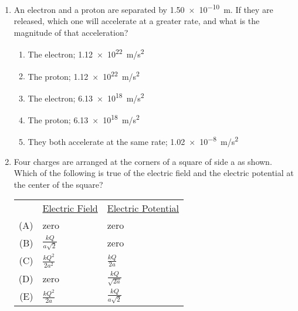 \documentclass{../../../oss-apphys}
\begin{document}
\begin{multicols}{2}
\begin{enumerate}[leftmargin=18pt]
  \item An electron and a proton are separated by \SI{1.50e-10}{\metre}. If
    they are released, which one will accelerate at a greater rate, and what is
    the magnitude of that acceleration?
    \begin{enumerate}[nosep,leftmargin=18pt,label=(\Alph*)]
    \item The electron; \SI{1.12e22}{m/s^2}
    \item The proton; \SI{1.12e22}{m/s^2}
    \item The electron; \SI{6.13e18}{m/s^2}
    \item The proton; \SI{6.13e18}{m/s^2}
    \item They both accelerate at the same rate; \SI{1.02e-8}{m/s^2}
    \end{enumerate}

  \item Four charges are arranged at the corners of a square of side a as shown.
    Which of the following is true of the electric field and the electric
    potential at the center of the square?
    \begin{center}
    \end{center}
    \begin{tabular}{rll}
      & \underline{Electric Field} & \underline{Electric Potential}\\
      (A) & zero & zero \\
      (B) & $\frac{kQ}{a\sqrt{2}}$ & zero \\
      (C) & $\frac{kQ^2}{2a^2}$ &  $\frac{kQ}{2a}$\\
      (D) & zero &  $\frac{kQ}{\sqrt{2a}}$\\
      (E) & $\frac{kQ^2}{2a}$ & $\frac{kQ}{a\sqrt{2}}$
    \end{tabular}

    \columnbreak
    

\end{enumerate}
\end{multicols}
\end{document}
